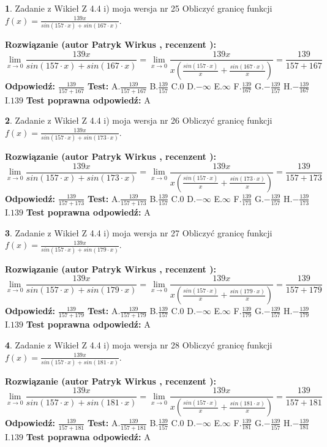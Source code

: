 \documentclass[12pt, a4paper]{article}
\theoremstyle{definition} %
\newtheorem{zad}{}
\newcommand{\zadStart}[1]{\begin{zad}#1\newline}
\newcommand{\zadStop}{\end{zad}}
\newcommand{\rozwStart}[2]{\noindent \textbf{Rozwiązanie (autor #1 , recenzent #2): }\newline}
\newcommand{\rozwStop}{\newline}
\newcommand{\odpStart}{\noindent \textbf{Odpowiedź:}\newline}
\newcommand{\odpStop}{\newline}
\newcommand{\testStart}{\noindent \textbf{Test:}\newline}
\newcommand{\testStop}{\newline}
\newcommand{\kluczStart}{\noindent \textbf{Test poprawna odpowiedź:}\newline}
\newcommand{\kluczStop}{\newline}
\begin{document}
\zadStart{Zadanie z Wikieł Z 4.4 i) moja wersja nr 25}
Obliczyć granicę funkcji $f(x)=\frac{139x}{sin(157\cdot x) +sin(167\cdot x)}$.
\zadStop
\rozwStart{Patryk Wirkus}{}
$$\lim\limits_{x\to 0}\frac{139x}{sin(157\cdot x) +sin(167\cdot x)}=\lim\limits_{x\to 0}\frac{139x}{x(\frac{sin(157\cdot x)}{x}+\frac{sin(167\cdot x)}{x})}=\frac{139}{157+167}$$
\rozwStop
\odpStart
$\frac{139}{157+167}$
\odpStop
\testStart
A.$\frac{139}{157+167}$
B.$\frac{139}{157}$
C.$0$
D.$-\infty$
E.$\infty$
F.$\frac{139}{167}$
G.$-\frac{139}{157}$
H.$-\frac{139}{167}$
I.$139$
\testStop
\kluczStart
A
\kluczStop



\zadStart{Zadanie z Wikieł Z 4.4 i) moja wersja nr 26}
Obliczyć granicę funkcji $f(x)=\frac{139x}{sin(157\cdot x) +sin(173\cdot x)}$.
\zadStop
\rozwStart{Patryk Wirkus}{}
$$\lim\limits_{x\to 0}\frac{139x}{sin(157\cdot x) +sin(173\cdot x)}=\lim\limits_{x\to 0}\frac{139x}{x(\frac{sin(157\cdot x)}{x}+\frac{sin(173\cdot x)}{x})}=\frac{139}{157+173}$$
\rozwStop
\odpStart
$\frac{139}{157+173}$
\odpStop
\testStart
A.$\frac{139}{157+173}$
B.$\frac{139}{157}$
C.$0$
D.$-\infty$
E.$\infty$
F.$\frac{139}{173}$
G.$-\frac{139}{157}$
H.$-\frac{139}{173}$
I.$139$
\testStop
\kluczStart
A
\kluczStop



\zadStart{Zadanie z Wikieł Z 4.4 i) moja wersja nr 27}
Obliczyć granicę funkcji $f(x)=\frac{139x}{sin(157\cdot x) +sin(179\cdot x)}$.
\zadStop
\rozwStart{Patryk Wirkus}{}
$$\lim\limits_{x\to 0}\frac{139x}{sin(157\cdot x) +sin(179\cdot x)}=\lim\limits_{x\to 0}\frac{139x}{x(\frac{sin(157\cdot x)}{x}+\frac{sin(179\cdot x)}{x})}=\frac{139}{157+179}$$
\rozwStop
\odpStart
$\frac{139}{157+179}$
\odpStop
\testStart
A.$\frac{139}{157+179}$
B.$\frac{139}{157}$
C.$0$
D.$-\infty$
E.$\infty$
F.$\frac{139}{179}$
G.$-\frac{139}{157}$
H.$-\frac{139}{179}$
I.$139$
\testStop
\kluczStart
A
\kluczStop



\zadStart{Zadanie z Wikieł Z 4.4 i) moja wersja nr 28}
Obliczyć granicę funkcji $f(x)=\frac{139x}{sin(157\cdot x) +sin(181\cdot x)}$.
\zadStop
\rozwStart{Patryk Wirkus}{}
$$\lim\limits_{x\to 0}\frac{139x}{sin(157\cdot x) +sin(181\cdot x)}=\lim\limits_{x\to 0}\frac{139x}{x(\frac{sin(157\cdot x)}{x}+\frac{sin(181\cdot x)}{x})}=\frac{139}{157+181}$$
\rozwStop
\odpStart
$\frac{139}{157+181}$
\odpStop
\testStart
A.$\frac{139}{157+181}$
B.$\frac{139}{157}$
C.$0$
D.$-\infty$
E.$\infty$
F.$\frac{139}{181}$
G.$-\frac{139}{157}$
H.$-\frac{139}{181}$
I.$139$
\testStop
\kluczStart
A
\kluczStop
\end{document}
